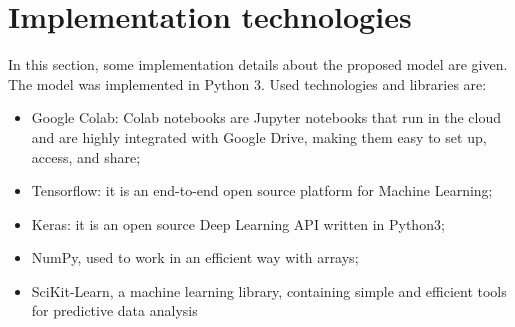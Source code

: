 \section{Implementation technologies}
In this section, some implementation details about the proposed model are given. The model was implemented in Python 3. Used technologies and libraries are:
\begin{itemize}
    \item {Google Colab: Colab notebooks are Jupyter notebooks that run in the cloud and are highly integrated with Google Drive, making them easy to set up, access, and share;}
    \item {Tensorflow: it is an end-to-end open source platform for Machine Learning;}
    \item {Keras: it is an open source Deep Learning API written in Python3;}
    \item {NumPy, used to work in an efficient way with arrays;}
    \item {SciKit-Learn, a machine learning library, containing simple and efficient tools for predictive data analysis}
\end{itemize}

